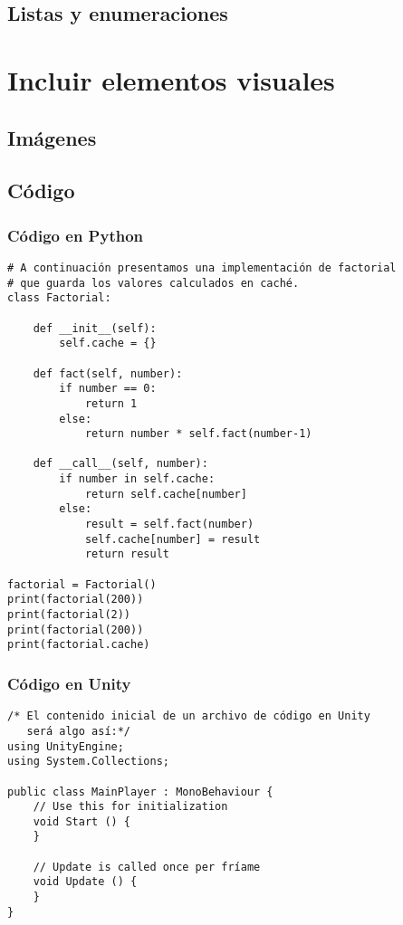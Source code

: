 \documentclass[twoside]{tfg-urjc}
\begin{document}
\subsection{Listas y enumeraciones}

\section{Incluir elementos visuales}

\subsection{Imágenes}
\label{sec:image}

\subsection{Código}

\subsubsection{Código en Python}

\begin{lstlisting}[style=Python]
# A continuación presentamos una implementación de factorial
# que guarda los valores calculados en caché.
class Factorial:

    def __init__(self):
        self.cache = {}

    def fact(self, number):
        if number == 0:
            return 1
        else:
            return number * self.fact(number-1)

    def __call__(self, number):
        if number in self.cache:
            return self.cache[number]
        else:
            result = self.fact(number)
            self.cache[number] = result
            return result

factorial = Factorial()
print(factorial(200))
print(factorial(2))
print(factorial(200))
print(factorial.cache)
\end{lstlisting}


\subsubsection{Código en Unity}

\begin{lstlisting}[style=Unity]
/* El contenido inicial de un archivo de código en Unity
   será algo así:*/
using UnityEngine;
using System.Collections;

public class MainPlayer : MonoBehaviour {
    // Use this for initialization
    void Start () {
    }
  
    // Update is called once per fríame
    void Update () {
    }
}
\end{lstlisting}
\end{document}
